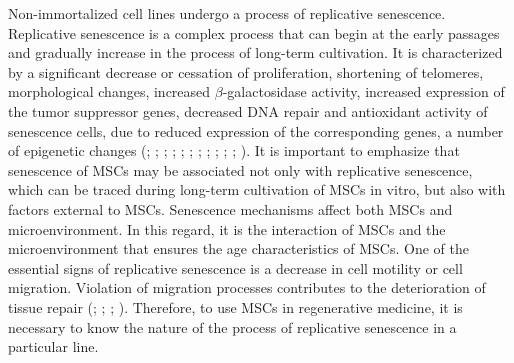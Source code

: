 \documentclass[alpha-refs]{wiley-article}
\begin{document}
Non-immortalized cell lines undergo a process of replicative senescence.
Replicative senescence is a complex process that can begin at the early passages and gradually increase in the process of long-term cultivation.
It is characterized by a significant decrease or cessation of proliferation, shortening of telomeres, morphological changes, increased $\beta$-galactosidase activity, increased expression of the tumor suppressor genes, decreased DNA repair and antioxidant activity of senescence cells, due to reduced expression of the corresponding genes, a number of epigenetic changes (\cite{wagner2008replicative}; \cite{kuilman2010essence}; \cite{redaelli2012cytogenomic}; \cite{estrada2013human}; \cite{savickiene2016senescence}; \cite{danisovic2017effect}; \cite{koltsova2018dynamics}; \cite{alessio2018mesenchymal}; \cite{krylova2018isolation}; \cite{niedernhofer2018nuclear}; \cite{truong2018characterization}; \cite{yu2018replicative}).
It is important to emphasize that senescence of MSCs may be associated not only with replicative senescence, which can be traced during long-term cultivation of MSCs in vitro, but also with factors external to MSCs.
Senescence mechanisms affect both MSCs and microenvironment.
In this regard, it is the interaction of MSCs and the microenvironment that ensures the age characteristics of MSCs.
One of the essential signs of replicative senescence is a decrease in cell motility or cell migration.
Violation of migration processes contributes to the deterioration of tissue repair (\cite{geissler2012functional}; \cite{bertolo2015vitro}; \cite{turinetto2016senescence}; \cite{zhang2018overexpression}).
Therefore, to use MSCs in regenerative medicine, it is necessary to know the nature of the process of replicative senescence in a particular line.
\end{document}
